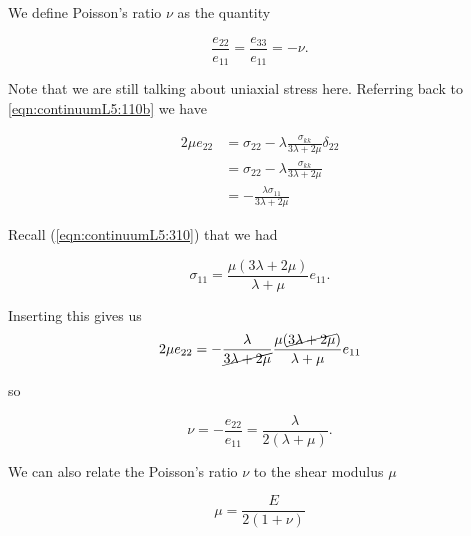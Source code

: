 We define Poisson's ratio $\nu$ as the quantity

\begin{equation}\label{eqn:continuumL5:350}
\frac{e_{22}}{e_{11}} = \frac{e_{33}}{e_{11}} = - \nu.
\end{equation}

Note that we are still talking about uniaxial stress here.  Referring back to \ref{eqn:continuumL5:110b} we have

\begin{align*}
2 \mu e_{2 2}
&= \sigma_{2 2} - \lambda \frac{\sigma_{k k}}{3 \lambda + 2 \mu} \delta_{2 2} \\
&= \sigma_{2 2} - \lambda \frac{\sigma_{k k}}{3 \lambda + 2 \mu} \\
&= - \frac{\lambda \sigma_{11}}{3 \lambda + 2 \mu}
\end{align*}

Recall (\ref{eqn:continuumL5:310}) that we had

\begin{equation}\label{eqn:continuumL5:370}
\sigma_{11} = \frac{\mu (3 \lambda + 2 \mu)}{\lambda + \mu} e_{11}.
\end{equation}

Inserting this gives us
\begin{align*}
2 \mu e_{22} 
= - \frac{\lambda}{\cancel{3 \lambda + 2 \mu}} \frac{ \mu (\cancel{3 \lambda + 2\mu})}{\lambda + \mu} e_{11}
\end{align*}

so

\begin{equation}\label{eqn:continuumL5:410}
\boxed{
\nu = -\frac{e_{22}}{e_{11}} = \frac{\lambda}{2 (\lambda + \mu)}.
}
\end{equation}

We can also relate the Poisson's ratio $\nu$ to the shear modulus $\mu$ 

\begin{equation}\label{eqn:continuumL5:430}
\mu = \frac{E}{2(1 + \nu)}
\end{equation}

